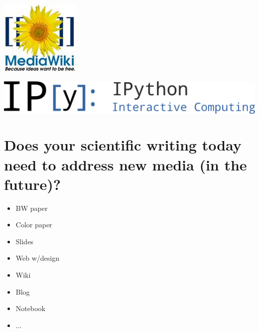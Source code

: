 \documentclass[%
twoside,                 %
final,                   %
chapterprefix=true,      %
open=right               %
10pt]{book}
\begin{document}


\begin{center}  %
  \centerline{\includegraphics[width=0.2\linewidth]{fig/MediaWiki_logo.jpg}}
\end{center}



\begin{center}  %
  \centerline{\includegraphics[width=0.6\linewidth]{fig/IPython_logo.png}}
\end{center}


\section*{Does your scientific writing today need to address new media (in the future)?}


\begin{itemize}
 \item BW paper

 \item Color paper

 \item Slides

 \item Web w/design

 \item Wiki

 \item Blog

 \item Notebook

 \item ...
\end{itemize}

\noindent

\end{document}
